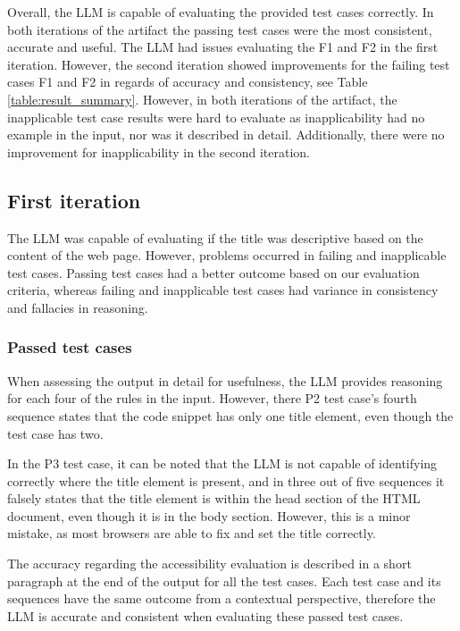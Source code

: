 Overall, the LLM is capable of evaluating the provided test cases correctly. In both iterations of the artifact the passing test cases were the most consistent, accurate and useful. The LLM had issues evaluating the F1 and F2 in the first iteration. However, the second iteration showed improvements for the failing test cases F1 and F2 in regards of accuracy and consistency, see Table \ref{table:result_summary}. However, in both iterations of the artifact, the inapplicable test case results were hard to evaluate as inapplicability had no example in the input, nor was it described in detail. Additionally, there were no improvement for inapplicability in the second iteration.


\subsection{First iteration}

The LLM was capable of evaluating if the title was descriptive based on the content of the web page. However, problems occurred in failing and inapplicable test cases. Passing test cases had a better outcome based on our evaluation criteria, whereas failing and inapplicable test cases had variance in consistency and fallacies in reasoning.

\subsubsection{Passed test cases}

When assessing the output in detail for usefulness, the LLM provides reasoning for each four of the rules in the input. However, there P2 test case's fourth sequence states that the code snippet has only one title element, even though the test case has two. 

In the P3 test case, it can be noted that the LLM is not capable of identifying correctly where the title element is present, and in three out of five sequences it falsely states that the title element is within the head section of the HTML document, even though it is in the body section. However, this is a minor mistake, as most browsers are able to fix and set the title correctly.

The accuracy regarding the accessibility evaluation is described in a short paragraph at the end of the output for all the test cases. Each test case and its sequences have the same outcome from a contextual perspective, therefore the LLM is accurate and consistent when evaluating these passed test cases.

